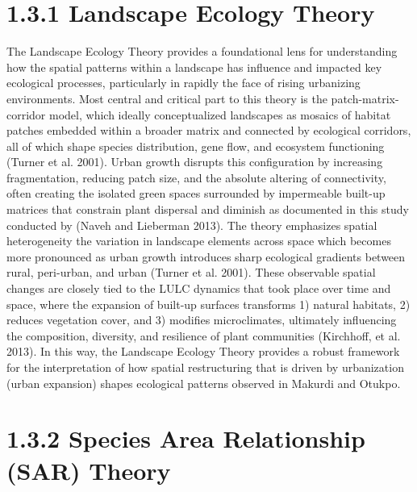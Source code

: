 \hypertarget{landscape-ecology-theory-1}{%
\section{\texorpdfstring{\textbf{1.3.1 Landscape Ecology Theory}}{1.3.1 Landscape Ecology Theory}}\label{landscape-ecology-theory-1}}

The Landscape Ecology Theory provides a foundational lens for understanding how the spatial patterns within a landscape has influence and impacted key ecological processes, particularly in rapidly the face of rising urbanizing environments. Most central and critical part to this theory is the patch-matrix-corridor model, which ideally conceptualized landscapes as mosaics of habitat patches embedded within a broader matrix and connected by ecological corridors, all of which shape species distribution, gene flow, and ecosystem functioning (Turner et al. 2001). Urban growth disrupts this configuration by increasing fragmentation, reducing patch size, and the absolute altering of connectivity, often creating the isolated green spaces surrounded by impermeable built-up matrices that constrain plant dispersal and diminish as documented in this study conducted by (Naveh and Lieberman 2013). The theory emphasizes spatial heterogeneity the variation in landscape elements across space which becomes more pronounced as urban growth introduces sharp ecological gradients between rural, peri-urban, and urban (Turner et al. 2001). These observable spatial changes are closely tied to the LULC dynamics that took place over time and space, where the expansion of built-up surfaces transforms 1) natural habitats, 2) reduces vegetation cover, and 3) modifies microclimates, ultimately influencing the composition, diversity, and resilience of plant communities (Kirchhoff, et al. 2013). In this way, the Landscape Ecology Theory provides a robust framework for the interpretation of how spatial restructuring that is driven by urbanization (urban expansion) shapes ecological patterns observed in Makurdi and Otukpo.
\hypertarget{species-area-relationship-sar-theory}{%
\section{\texorpdfstring{\textbf{1.3.2 Species Area Relationship (SAR) Theory}}{1.3.2 Species Area Relationship (SAR) Theory}}\label{species-area-relationship-sar-theory}}

